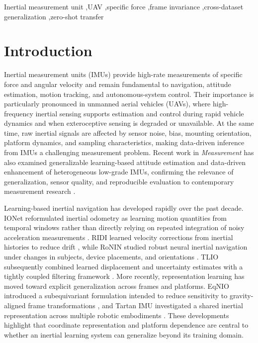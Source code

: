 \documentclass[preprint,12pt]{elsarticle}
\begin{document}
\begin{frontmatter}
\begin{keyword}
Inertial measurement unit \sep UAV \sep specific force \sep frame invariance \sep cross-dataset generalization \sep zero-shot transfer
\end{keyword}

\end{frontmatter}

\section{Introduction}
\label{sec:introduction}

Inertial measurement units (IMUs) provide high-rate measurements of specific force and angular velocity and remain fundamental to navigation, attitude estimation, motion tracking, and autonomous-system control. Their importance is particularly pronounced in unmanned aerial vehicles (UAVs), where high-frequency inertial sensing supports estimation and control during rapid vehicle dynamics and when exteroceptive sensing is degraded or unavailable. At the same time, raw inertial signals are affected by sensor noise, bias, mounting orientation, platform dynamics, and sampling characteristics, making data-driven inference from IMUs a challenging measurement problem.
Recent work in \emph{Measurement} has also examined generalizable learning-based attitude estimation and data-driven enhancement of heterogeneous low-grade IMUs, confirming the relevance of generalization, sensor quality, and reproducible evaluation to contemporary measurement research \cite{Golroudbari2023Measurement,Sahu2026ALiMU}.

Learning-based inertial navigation has developed rapidly over the past decade. IONet reformulated inertial odometry as learning motion quantities from temporal windows rather than directly relying on repeated integration of noisy acceleration measurements \cite{Chen2018IONet}. RIDI learned velocity corrections from inertial histories to reduce drift \cite{Yan2018RIDI}, while RoNIN studied robust neural inertial navigation under changes in subjects, device placements, and orientations \cite{Herath2020RoNIN}. TLIO subsequently combined learned displacement and uncertainty estimates with a tightly coupled filtering framework \cite{Liu2020TLIO}. More recently, representation learning has moved toward explicit generalization across frames and platforms. EqNIO introduced a subequivariant formulation intended to reduce sensitivity to gravity-aligned frame transformations \cite{Jayanth2025EqNIO}, and Tartan IMU investigated a shared inertial representation across multiple robotic embodiments \cite{Zhao2025TartanIMU}. These developments highlight that coordinate representation and platform dependence are central to whether an inertial learning system can generalize beyond its training domain.
\end{document}
